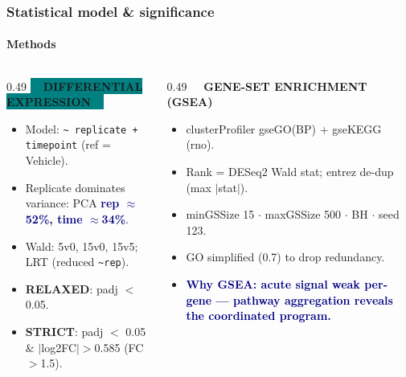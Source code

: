\documentclass[aspectratio=169,11pt]{beamer}
\newcommand{\hi}[1]{\textcolor{navy}{\textbf{#1}}}
\begin{document}
\begin{frame}
  \frametitle{Statistical model \& significance}\framesubtitle{Methods}
  \begin{columns}[T]
    \begin{column}{0.49\textwidth}
      \colorbox{teal}{\color{white}\scriptsize\bfseries\ \ DIFFERENTIAL EXPRESSION\ \ }\\[4pt]
      \footnotesize
      \begin{itemize}\setlength\itemsep{3pt}
        \item Model: \texttt{\textasciitilde\ replicate + timepoint} (ref = Vehicle).
        \item Replicate dominates variance: PCA \hi{rep $\approx$52\%, time $\approx$34\%}.
        \item Wald: 5v0, 15v0, 15v5; LRT (reduced \texttt{\textasciitilde rep}).
        \item \textbf{RELAXED}: padj $<$ 0.05.
        \item \textbf{STRICT}: padj $<$ 0.05 \& $|$log2FC$|>$0.585 (FC$>$1.5).
      \end{itemize}
    \end{column}
    \begin{column}{0.49\textwidth}
      \colorbox{teald}{\color{white}\scriptsize\bfseries\ \ GENE-SET ENRICHMENT (GSEA)\ \ }\\[4pt]
      \footnotesize
      \begin{itemize}\setlength\itemsep{3pt}
        \item clusterProfiler gseGO(BP) + gseKEGG (rno).
        \item Rank = DESeq2 Wald stat; entrez de-dup (max $|$stat$|$).
        \item minGSSize 15 $\cdot$ maxGSSize 500 $\cdot$ BH $\cdot$ seed 123.
        \item GO simplified (0.7) to drop redundancy.
        \item \hi{Why GSEA: acute signal weak per-gene --- pathway aggregation
          reveals the coordinated program.}
      \end{itemize}
    \end{column}
  \end{columns}
\end{frame}
\end{document}
